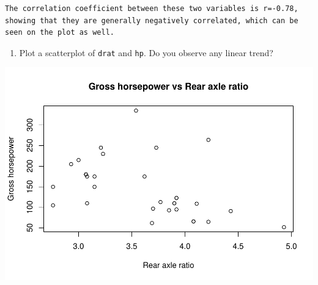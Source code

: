 \documentclass[
]{article}
\newenvironment{Shaded}{\begin{snugshade}}{\end{snugshade}}
\newcommand{\DataTypeTok}[1]{\textcolor[rgb]{0.13,0.29,0.53}{#1}}
\newcommand{\KeywordTok}[1]{\textcolor[rgb]{0.13,0.29,0.53}{\textbf{#1}}}
\newcommand{\NormalTok}[1]{#1}
\newcommand{\OperatorTok}[1]{\textcolor[rgb]{0.81,0.36,0.00}{\textbf{#1}}}
\newcommand{\StringTok}[1]{\textcolor[rgb]{0.31,0.60,0.02}{#1}}
\providecommand{\tightlist}{%
  \setlength{\itemsep}{0pt}\setlength{\parskip}{0pt}}
\begin{document}
\begin{verbatim}
The correlation coefficient between these two variables is r=-0.78, showing that they are generally negatively correlated, which can be seen on the plot as well. 
\end{verbatim}

\begin{enumerate}
\def\labelenumi{\arabic{enumi}.}
\setcounter{enumi}{2}
\tightlist
\item
  Plot a scatterplot of \texttt{drat} and \texttt{hp}. Do you observe
  any linear trend?
\end{enumerate}

\begin{Shaded}
\end{Shaded}

\includegraphics{CA2_DataAnalysis_files/figure-latex/unnamed-chunk-8-1.pdf}

\begin{Shaded}
\end{Shaded}
\end{document}
